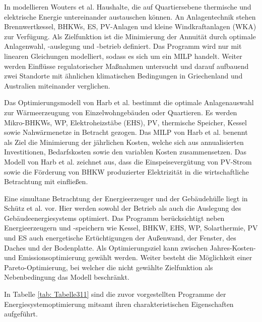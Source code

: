In \cite{Wouters.2014} modellieren Wouters et al. Haushalte, die auf Quartiersebene thermische und elektrische Energie untereinander austauschen können.
An Anlagentechnik stehen Brennwertkessel, BHKWs, ES, PV-Anlagen und kleine Windkraftanlagen (WKA) zur Verfügung.
Als Zielfunktion ist die Minimierung der Annuität durch optimale Anlagenwahl, -auslegung und -betrieb definiert.
Das Programm wird nur mit linearen Gleichungen modelliert, sodass es sich um ein MILP handelt.
Weiter werden Einflüsse regulatorischer Maßnahmen untersucht und darauf aufbauend zwei Standorte mit ähnlichen klimatischen Bedingungen in Griechenland und Australien miteinander verglichen.

Das Optimierungsmodell von Harb et al. \cite{Harb.2016} bestimmt die optimale Anlagenauswahl zur Wärmeerzeugung von Einzelwohngebäuden oder Quartieren.
Es werden Mikro-BHKWs, WP, Elektroheizstäbe (EHS), PV, thermische Speicher, Kessel sowie Nahwärmenetze in Betracht gezogen.
Das MILP von Harb et al. benennt als Ziel die Minimierung der jährlichen Kosten, welche sich aus annualisierten Investitionen, Bedarfskosten sowie den variablen Kosten zusammensetzen.
Das Modell von Harb et al. zeichnet aus, dass die Einspeisevergütung von PV-Strom sowie die Förderung von BHKW produzierter Elektrizität in die wirtschaftliche Betrachtung mit einfließen.

Eine simultane Betrachtung der Energieerzeuger und der Gebäudehülle liegt in Schütz et al. \cite{Schutz.2017} vor.
Hier werden sowohl der Betrieb als auch die Auslegung des Gebäudeenergiesystems optimiert.
Das Programm berücksichtigt neben Energieerzeugern und -speichern wie Kessel, BHKW, EHS, WP, Solarthermie, PV und ES auch energetische Ertüchtigungen der Außenwand, der Fenster, des Daches und der Bodenplatte.
Als Optimierungsziel kann zwischen Jahres-Kosten- und Emissionsoptimierung gewählt werden.
Weiter besteht die Möglichkeit einer Pareto-Optimierung, bei welcher die nicht gewählte Zielfunktion als Nebenbedingung das Modell beschränkt.

In Tabelle \ref{tab: Tabelle311} sind die zuvor vorgestellten Programme der Energiesystemoptimierung mitsamt ihren charakteristischen Eigenschaften aufgeführt.

